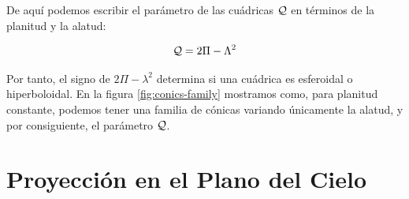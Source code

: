 De aquí podemos escribir el parámetro de las cuádricas $\mathcal{Q}$ en términos de la planitud y la alatud:

\begin{align}
  \mathcal{Q} = 2\Pi - \Lambda^2 \label{eq:quadric-parameter-pi-lambda}
\end{align}

Por tanto, el signo de $2\Pi - \lambda^2$ determina si una cuádrica es esferoidal o hiperboloidal. En la figura \ref{fig:conics-family} mostramos como, para planitud constante, podemos tener una familia de cónicas variando únicamente la alatud, y por consiguiente, el parámetro $\mathcal{Q}$.

\section{Proyección en el Plano del Cielo}
\label{sec:projection}


